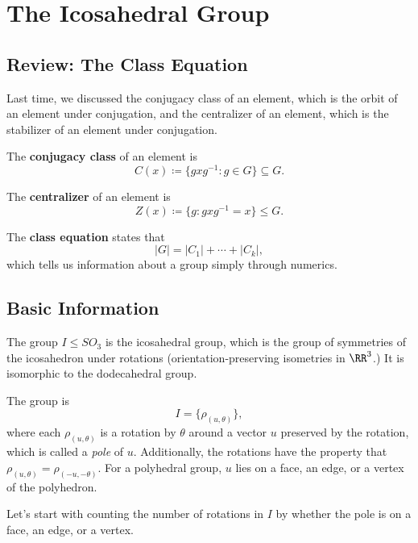 \newpage


\section{The Icosahedral Group}

\subsection{Review: The Class Equation}
Last time, we discussed the conjugacy class of an element, which is the orbit of an element under conjugation, and the centralizer of an element, which is the stabilizer of an element under conjugation. 
\begin{definition}
The \textbf{conjugacy class} of an element is 
\[
C(x) \coloneqq \{gxg^{-1} : g \in G\} \subseteq G.
\]
\end{definition}

\begin{definition}
The \textbf{centralizer} of an element is 
\[
Z(x) \coloneqq \{g: gxg^{-1} = x\} \leq G.
\]
\end{definition}

The \textbf{class equation} states that 
\[
|G| = |C_1| + \cdots + |C_k|,
\]
which tells us information about a group simply through numerics.

\subsection{Basic Information}
The group $I \leq SO_3$ is the icosahedral group, which is the group of symmetries of the icosahedron under rotations (orientation-preserving isometries in $\RR^3$.) It is isomorphic to the dodecahedral group.

The group is \[I = \{\rho_{(u, \theta)}\},\] where each $\rho_{(u, \theta)}$ is a rotation by $\theta$ around a vector $u$ preserved by the rotation, which is called a \emph{pole} of $u.$ Additionally, the rotations have the property that $\rho_{(u, \theta)} = \rho_{(-u, -\theta)}.$ For a polyhedral group, $u$ lies on a face, an edge, or a vertex of the polyhedron. 

Let's start with counting the number of rotations in $I$ by whether the pole is on a face, an edge, or a vertex.

